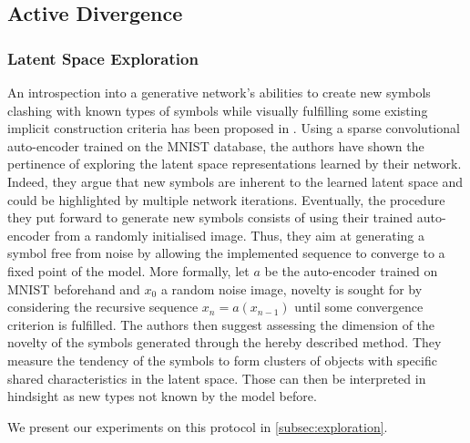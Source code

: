 \documentclass{article}
\begin{document}

\subsection{Active Divergence}
\label{subsec:act_div}

\subsubsection{Latent Space Exploration}
\label{subsub:latent_expl}

An introspection into a generative network's abilities to create new symbols 
clashing with known types of symbols while visually fulfilling some existing 
implicit construction criteria has been proposed in \cite{kazakciDigitsThatAre2017}.
Using a sparse convolutional auto-encoder trained on the MNIST database, 
the authors have shown the pertinence of exploring the latent space representations 
learned by their network. 
Indeed, they argue that new symbols are inherent to the learned latent
space and could be highlighted by multiple network iterations.
Eventually, the procedure they put forward to generate new symbols consists 
of using their trained auto-encoder from a randomly initialised image.
Thus, they aim at generating a symbol free from noise by allowing the implemented 
sequence to converge to a fixed point of the model.
More formally, let $a$ be the auto-encoder trained on MNIST beforehand
and $x_{0}$ a random noise image, novelty is sought for by considering
the recursive sequence $x_{n} = a(x_{n-1})$ until some convergence criterion is fulfilled.
The authors then suggest assessing the dimension of the novelty of the symbols
generated through the hereby described method.
They measure the tendency of the symbols to form clusters of objects with specific shared characteristics
in the latent space.
Those can then be interpreted in hindsight as new types not known by the model before.

We present our experiments on this protocol in \ref{subsec:exploration}. \\
\end{document}
